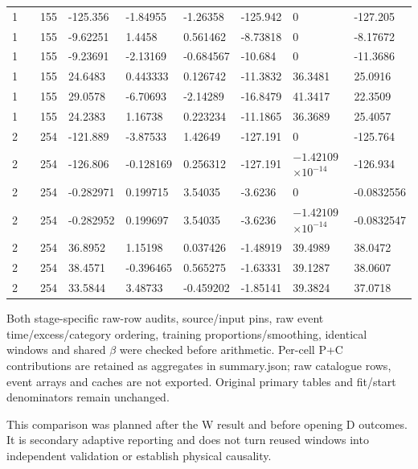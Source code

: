 \begin{longtable}
{}1 &  & 155 & -125.356 & -1.84955 & -1.26358 & -125.942 & 0 & -127.205 \\
{}1 &  & 155 & -9.62251 & 1.4458 & 0.561462 & -8.73818 & 0 & -8.17672 \\
{}1 &  & 155 & -9.23691 & -2.13169 & -0.684567 & -10.684 & 0 & -11.3686 \\
{}1 &  & 155 & 24.6483 & 0.443333 & 0.126742 & -11.3832 & 36.3481 & 25.0916 \\
{}1 &  & 155 & 29.0578 & -6.70693 & -2.14289 & -16.8479 & 41.3417 & 22.3509 \\
{}1 &  & 155 & 24.2383 & 1.16738 & 0.223234 & -11.1865 & 36.3689 & 25.4057 \\
{}2 &  & 254 & -121.889 & -3.87533 & 1.42649 & -127.191 & 0 & -125.764 \\
{}2 &  & 254 & -126.806 & -0.128169 & 0.256312 & -127.191 &  & -126.934 \\
{}2 &  & 254 & -0.282971 & 0.199715 & 3.54035 & -3.6236 & 0 & -0.0832556 \\
{}2 &  & 254 & -0.282952 & 0.199697 & 3.54035 & -3.6236 &  & -0.0832547 \\
{}2 &  & 254 & 36.8952 & 1.15198 & 0.037426 & -1.48919 & 39.4989 & 38.0472 \\
{}2 &  & 254 & 38.4571 & -0.396465 & 0.565275 & -1.63331 & 39.1287 & 38.0607 \\
{}2 &  & 254 & 33.5844 & 3.48733 & -0.459202 & -1.85141 & 39.3824 & 37.0718 \\
\end{longtable}\endgroup

Both stage-specific raw-row audits, source/input pins, raw event time/excess/category ordering, training proportions/smoothing, identical windows and shared $\beta$ were checked before arithmetic. Per-cell P+C contributions are retained as aggregates in summary.json; raw catalogue rows, event arrays and caches are not exported. Original primary tables and fit/start denominators remain unchanged.

This comparison was planned after the W result and before opening D outcomes. It is secondary adaptive reporting and does not turn reused windows into independent validation or establish physical causality.


